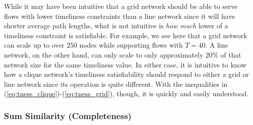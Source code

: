 While it may have been intuitive that a grid network should be able to serve flows with lower timeliness constraints than a line network since it will have shorter average path lengths, what is not intuitive is \emph{how much} lower of a timeliness constraint is satisfiable.  For example, we see here that a grid network can scale up to over $250$ nodes while supporting flows with $T = 40$.  A line network, on the other hand, can only scale to only approximately $20\%$ of that network size for the same timeliness value.  In either case, it is intuitive to know how a clique network's timeliness satisfiability should respond to either a grid or line network since its operation is quite different.  With the inequalities in (\ref{eq:tness_clique})-(\ref{eq:tness_grid}), though, it is quickly and easily understood.

%

\subsubsection{Sum Similarity (Completeness)}

